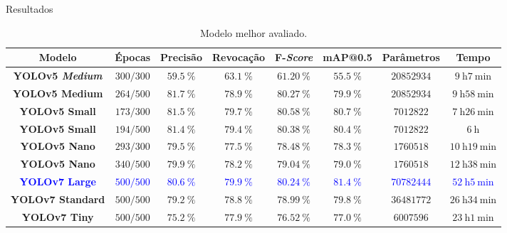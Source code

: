 \begin{frame}[shrink=8]{Resultados}
\begin{table}[h!]
\caption{Modelo melhor avaliado.} \label{tab:resultadosExperimentais}
\begin{footnotesize}
\begin{tabular}{cccccccc}
\toprule
\textbf{Modelo} & \textbf{Épocas} &\textbf{Precisão} & \textbf{Revocação} & \textbf{F-\emph{Score}} & \textbf{mAP@0.5} & \textbf{Parâmetros} & \textbf{Tempo}\\
\midrule
\textbf{YOLOv5 \emph{Medium}} & $300/300$ & $\SI{59,5}{\percent}$ & $\SI{63,1}{\percent}$ & $\SI{61,20}{\percent}$ & $\SI{55,5}{\percent}$ & $\num{20852934}$ & $\SI{9}{\hour}\SI{7}{\minute}$\\
\textbf{YOLOv5 Medium} & $264/500$ & $\SI{81,7}{\percent}$ & $\SI{78,9}{\percent}$ & $\SI{80,27}{\percent}$ & $\SI{79,9}{\percent}$ & $\num{20852934}$ & $\SI{9}{\hour}\SI{58}{\minute}$\\
\textbf{YOLOv5 Small} & $173/300$ & $\SI{81,5}{\percent}$ & $\SI{79,7}{\percent}$ & $\SI{80,58}{\percent}$ & $\SI{80,7}{\percent}$ & $\num{7012822}$ & $\SI{7}{\hour}\SI{26}{\minute}$\\
\textbf{YOLOv5 Small} & $194/500$ & $\SI{81,4}{\percent}$ & $\SI{79,4}{\percent}$ & $\SI{80,38}{\percent}$ & $\SI{80,4}{\percent}$ & $\num{7012822}$ & $\SI{6}{\hour}$\\
\textbf{YOLOv5 Nano} & $293/300$ & $\SI{79,5}{\percent}$ & $\SI{77,5}{\percent}$ & $\SI{78,48}{\percent}$ & $\SI{78,3}{\percent}$ & $\num{1760518}$ & $\SI{10}{\hour}\SI{19}{\minute}$\\
\textbf{YOLOv5 Nano} & $340/500$ & $\SI{79,9}{\percent}$ & $\SI{78,2}{\percent}$ & $\SI{79,04}{\percent}$ & $\SI{79,0}{\percent}$ & $\num{1760518}$ & $\SI{12}{\hour}\SI{38}{\minute}$\\
\midrule
\textcolor{blue}{\textbf{YOLOv7 Large}} & \textcolor{blue}{$500/500$} & \textcolor{blue}{$\SI{80,6}{\percent}$} & \textcolor{blue}{$\SI{79,9}{\percent}$} & \textcolor{blue}{$\SI{80,24}{\percent}$} & \textcolor{blue}{$\SI{81,4}{\percent}$} & \textcolor{blue}{$\num{70782444}$} & \textcolor{blue}{$\SI{52}{\hour}\SI{5}{\minute}$}\\
\textbf{YOLOv7 Standard} & $500/500$ & $\SI{79,2}{\percent}$ & $\SI{78,8}{\percent}$ & $\SI{78,99}{\percent}$ & $\SI{79,8}{\percent}$ & $\num{36481772}$ & $\SI{26}{\hour}\SI{34}{\minute}$\\
\textbf{YOLOv7 Tiny} & $500/500$ & $\SI{75,2}{\percent}$ & $\SI{77,9}{\percent}$ & $\SI{76,52}{\percent}$ & $\SI{77,0}{\percent}$ & $\num{6007596}$ & $\SI{23}{\hour}\SI{1}{\minute}$\\
\bottomrule
\end{tabular}
\end{footnotesize}
\end{table}
\end{frame}

